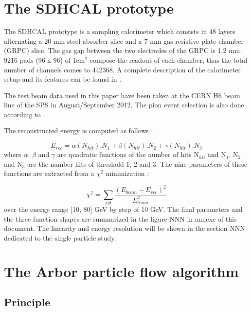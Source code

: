 \documentclass[cits]{JINST}
\begin{document}
\section{The SDHCAL prototype}

The SDHCAL prototype is a sampling calorimeter which consists in 48 layers alternating a 20 mm steel absorber slice and a 7 mm gas resistive plate chamber (GRPC) slice. The gas gap between the two electrodes of the GRPC is 1.2 mm. 9216 pads (96 x 96) of 1cm$^2$ compose the readout of each chamber, thus the total number of channels  comes to 442368. A complete description of the calorimeter setup and its features can be found in \cite{sdhcal-paper}. 

The test beam data used in this paper have been taken at the CERN H6 beam line of the SPS in August/September 2012. The pion event selection is also done according to \cite{sdhcal-paper}.

The reconstructed energy is computed as follows :

\begin{equation}
  E_{rec} = \alpha(N_{hit}).N_{1}
          + \beta(N_{hit}) .N_{2}
          + \gamma(N_{hit}).N_{3}   
\end{equation}
where $\alpha$, $\beta$ and $\gamma$ are quadratic functions of the number of hits N$_{hit}$ and N$_1$, N$_2$ and N$_3$ are the number hits of threshold 1, 2 and 3. The nine parameters of these functions are extracted from a $\chi^2$ minimization :

\begin{equation}
  \chi^2 = \sum\limits_{evt} \frac{(E_{beam} - E_{rec})^2}{E_{beam}^2}
\end{equation}
over the energy range [10, 80] GeV by step of 10 GeV. The final parameters and the three function shapes are summarized in the figure NNN in annexe of this document. The linearity and energy resolution will be shown in the section NNN dedicated to the single particle study.

\section{The Arbor particle flow algorithm}

\subsection{Principle} 
\end{document}
